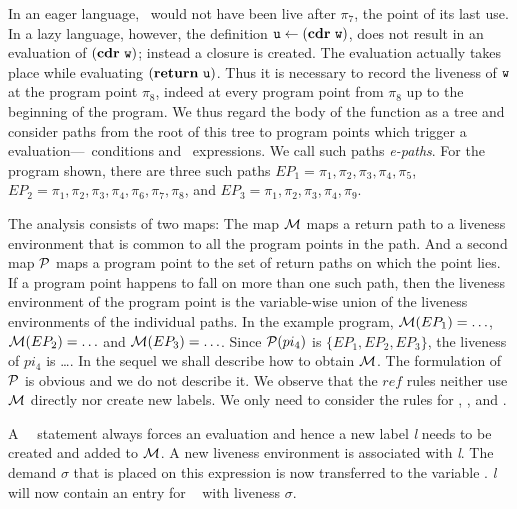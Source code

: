 \documentclass{sig-alternate}
\begin{document}
In an  eager  language, \pw\  would  not have  been live  after
 $\pi_7$, the point of its last use. In a lazy language, however, the
  definition  $\mbox{\tt u}  \leftarrow  (\mbox{$\mathbf{cdr}$}~\mbox{\tt w})$,  does not  result  in  an
  evaluation  of  $(\mbox{$\mathbf{cdr}$}~\mbox{\tt w})$; instead  a  closure  is created.   The
  evaluation actually takes place while evaluating $(\mbox{$\mathbf{ return}$}~\mbox{\tt u})$. Thus
  it is necessary to record the liveness of $\mbox{\tt w}$ at the program point
  $\pi_8$, indeed at every program point  from $\pi_8$ up to the
  beginning of the program.
  We thus  regard the body of the function as a
  tree and consider paths from the root of this tree to program points
  which     trigger     a     evaluation---\SIF\    conditions     and
  \RETURN\  expressions. We call  such paths  {\em e-paths}.   For the
  program  shown, there  are three  such paths  $EP_1 =  \pi_1, \pi_2,
  \pi_3,  \pi_4, \pi_5$, $EP_2  = \pi_1,  \pi_2, \pi_3,  \pi_4, \pi_6,
  \pi_7, \pi_8$, and $EP_3 =  \pi_1, \pi_2, \pi_3, \pi_4, \pi_9$.  

The analysis  consists of  two maps: The  map $\cal{M}$ maps  a return
path  to a  liveness environment  that is  common to  all  the program
points in the path. And a second map $\cal{P}$ maps a program point to
the set of  return paths on which the point lies.   If a program point
happens  to  fall  on more  than  one  such  path, then  the  liveness
environment of  the program  point is the  variable-wise union  of the
liveness  environments  of  the  individual  paths.   In  the  example
program, ${\cal M}(EP_1)=  \ldots$, ${\cal M}(EP_2)=\ldots$ and ${\cal
  M}(EP_3)= \ldots$.   Since ${\cal P}(pi_4)$ is  $\lbrace EP_1, EP_2,
EP_3 \rbrace$,  the liveness  of $pi_4$ is  \ldots.  In the  sequel we
shall describe how to  obtain $\cal{M}$.  The formulation of $\cal{P}$
is obvious  and we do  not describe it.   We observe that  the ${ref}$
rules neither use  ${\cal M}$ directly nor create  new labels. We only
need to consider the rules for {\LET}, {\SIF}, and {\RETURN}.

 
  A {\RETURN~\px}\  statement always forces an evaluation and hence a new 
  label {\em l} needs to be created and added to $\cal{M}$. A new liveness
  environment is associated with {\em l}. The demand $\sigma$ that is placed 
  on this expression is now transferred to the variable \px. {\em l} will now
  contain an entry for \px~ with liveness $\sigma$.
\end{document}
